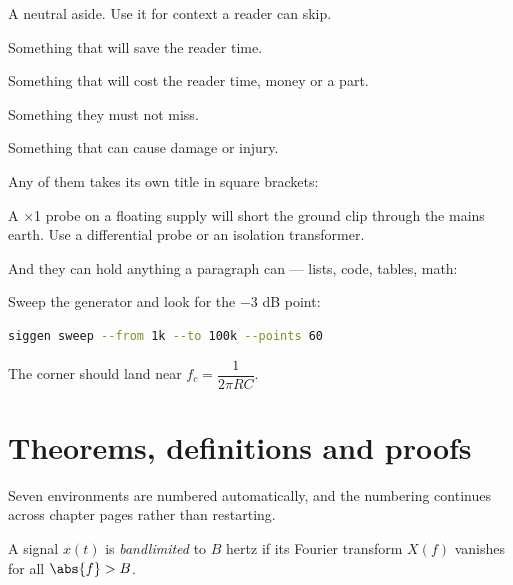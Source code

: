 \begin{note}
A neutral aside. Use it for context a reader can skip.
\end{note}

\begin{tip}
Something that will save the reader time.
\end{tip}

\begin{warning}
Something that will cost the reader time, money or a part.
\end{warning}

\begin{important}
Something they must not miss.
\end{important}

\begin{caution}
Something that can cause damage or injury.
\end{caution}

Any of them takes its own title in square brackets:

\begin{warning}
A ×1 probe on a floating supply will short the ground clip through the mains earth. Use a differential probe or an isolation transformer.
\end{warning}

And they can hold anything a paragraph can — lists, code, tables, math:

\begin{tip}
Sweep the generator and look for the −3 dB point:

\begin{lstlisting}[language=bash]
siggen sweep --from 1k --to 100k --points 60
\end{lstlisting}

The corner should land near $f_c = \dfrac{1}{2\pi RC}$.
\end{tip}

\section{Theorems, definitions and proofs}

Seven environments are numbered automatically, and the numbering continues across chapter pages rather than restarting.

\begin{definition}
\label{def-bandlimited}
A signal $x(t)$ is \emph{bandlimited} to $B$ hertz if its Fourier transform $X(f)$ vanishes for all $\abs{f} > B$.
\end{definition}


